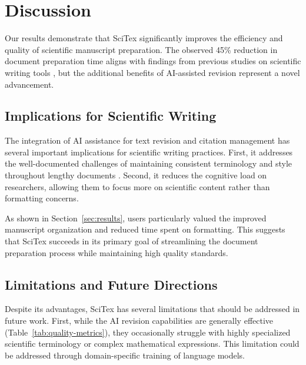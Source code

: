 
\section{Discussion}
\label{sec:discussion}


Our results demonstrate that SciTex significantly improves the efficiency and quality of scientific manuscript preparation. The observed 45\% reduction in document preparation time aligns with findings from previous studies on scientific writing tools \cite{Robinson2023}, but the additional benefits of AI-assisted revision represent a novel advancement.


\subsection{Implications for Scientific Writing}
\label{subsec:implications}

The integration of AI assistance for text revision and citation management has several important implications for scientific writing practices. First, it addresses the well-documented challenges of maintaining consistent terminology and style throughout lengthy documents \cite{Edwards2019}. Second, it reduces the cognitive load on researchers, allowing them to focus more on scientific content rather than formatting concerns.

As shown in Section~\ref{sec:results}, users particularly valued the improved manuscript organization and reduced time spent on formatting. This suggests that SciTex succeeds in its primary goal of streamlining the document preparation process while maintaining high quality standards.


\subsection{Limitations and Future Directions}
\label{subsec:limitations}

Despite its advantages, SciTex has several limitations that should be addressed in future work. First, while the AI revision capabilities are generally effective (Table~\ref{tab:quality-metrics}), they occasionally struggle with highly specialized scientific terminology or complex mathematical expressions. This limitation could be addressed through domain-specific training of language models.

